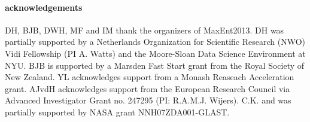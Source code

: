 \documentclass[12pt]{emulateapj}
\begin{document}
\paragraph{acknowledgements}
DH, BJB, DWH, MF and IM thank the organizers of MaxEnt2013. DH was partially supported by a Netherlands Organization for Scientific Research (NWO) Vidi Fellowship (PI A. Watts) and the Moore-Sloan Data Science Environment at NYU. BJB is supported
by a Marsden Fast Start grant from the Royal Society of New Zealand. YL acknowledges support from a Monash Reaseach Acceleration grant.  AJvdH acknowledges support from the European Research Council via Advanced Investigator Grant no. 247295 (PI: R.A.M.J. Wijers).
C.K. and was partially supported by NASA grant NNH07ZDA001-GLAST.  



\end{document}
